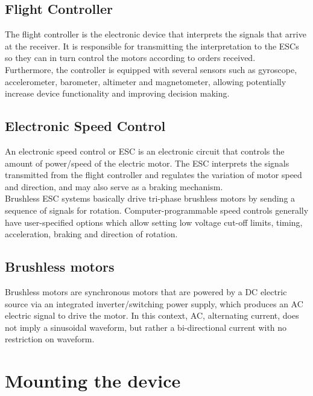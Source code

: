 \documentclass[12pt, a4paper,twoside]{tesi_upf}
\begin{document}
\section{Flight Controller}

The flight controller is the electronic device that interprets the signals that arrive at the receiver. It is responsible for transmitting the interpretation to the ESCs so they can in turn control the motors according to orders received. 
\\[12pt]

Furthermore, the controller is equipped with several sensors such as gyroscope, accelerometer, barometer, altimeter and magnetometer, allowing potentially increase device functionality and improving decision making.

\section{Electronic Speed Control}

An electronic speed control or ESC is an electronic circuit that controls the amount of power/speed of the electric motor. The ESC interprets the signals transmitted from the flight controller and regulates the variation of motor speed and direction, and may also serve as a braking mechanism.
\\[12pt]

Brushless ESC systems basically drive tri-phase brushless motors by sending a sequence of signals for rotation. Computer-programmable speed controls generally have user-specified options which allow setting low voltage cut-off limits, timing, acceleration, braking and direction of rotation.

\section{Brushless motors}

Brushless motors are synchronous motors that are powered by a DC electric source via an integrated inverter/switching power supply, which produces an AC electric signal to drive the motor. In this context, AC, alternating current, does not imply a sinusoidal waveform, but rather a bi-directional current with no restriction on waveform. 


\chapter{Mounting the device}
\end{document}
